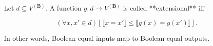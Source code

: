 Let $d \subseteq V^{(\mathbf{B})}$. A function $g: d \rightarrow V^{(\mathbf{B})}$ is called **extensional** iff

$$(\forall x, x' \in d)[\llbracket x = x' \rrbracket \leq \llbracket g(x) = g(x') \rrbracket].$$

In other words, Boolean-equal inputs map to Boolean-equal outputs.
